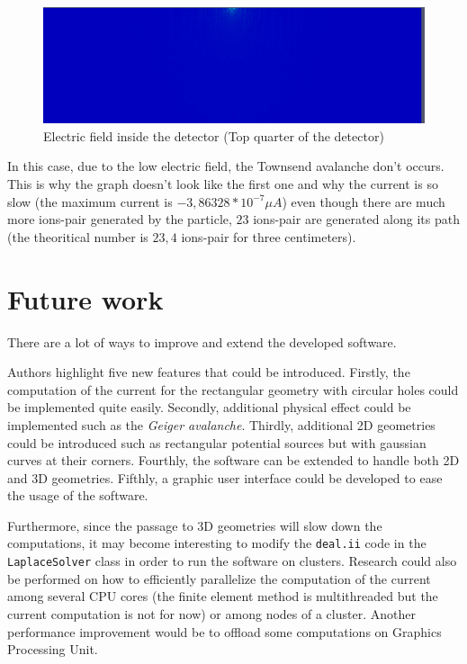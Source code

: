 \documentclass[11pt]{article}
\begin{document}
			\begin{figure}[H]
			  \center
			  \includegraphics[scale=0.4]{images/applications/electric_field.png}
			  \caption{Electric field inside the detector (Top quarter of the detector)}
			  \label{fig:electric_field}
			\end{figure}

			In this case, due to the low electric field, the Townsend avalanche don't occurs. This is why the graph doesn't
			look like the first one and why the current is so slow (the maximum current is $-3,86328*10^{-7}\mu A$) even though
			there are much more ions-pair generated by the particle, $23$ ions-pair are generated along its path (the theoritical
			number is $23,4$ ions-pair for three centimeters).

\section{Future work}

There are a lot of ways to improve and extend the developed software.

Authors highlight five new features that could be introduced. Firstly, the
computation of the current for the
rectangular geometry with circular holes could be implemented quite easily.
Secondly, additional physical effect
could be implemented such as the \textit{Geiger avalanche}. Thirdly,
additional 2D geometries could be introduced such as
rectangular potential sources but with gaussian curves at their corners.
Fourthly, the software can be extended to handle both 2D and 3D geometries.
Fifthly, a graphic user interface could be developed to ease the usage of the
software.

Furthermore, since the passage to 3D geometries will slow down the computations,
it may become interesting to modify the \texttt{deal.ii} code in the
\texttt{LaplaceSolver} class in order to run the software on clusters.
Research could also be performed on how to efficiently parallelize the
computation of the current among several CPU cores (the finite element method
is multithreaded but the current computation is not for now) or among nodes of a cluster.
Another performance improvement would be to offload some computations on
Graphics Processing Unit.
\end{document}
